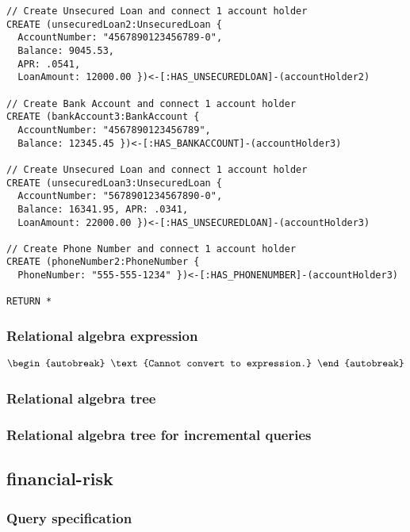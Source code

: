 \begin{lstlisting}
// Create Unsecured Loan and connect 1 account holder
CREATE (unsecuredLoan2:UnsecuredLoan {
  AccountNumber: "4567890123456789-0",
  Balance: 9045.53,
  APR: .0541,
  LoanAmount: 12000.00 })<-[:HAS_UNSECUREDLOAN]-(accountHolder2)

// Create Bank Account and connect 1 account holder
CREATE (bankAccount3:BankAccount {
  AccountNumber: "4567890123456789",
  Balance: 12345.45 })<-[:HAS_BANKACCOUNT]-(accountHolder3)

// Create Unsecured Loan and connect 1 account holder
CREATE (unsecuredLoan3:UnsecuredLoan {
  AccountNumber: "5678901234567890-0",
  Balance: 16341.95, APR: .0341,
  LoanAmount: 22000.00 })<-[:HAS_UNSECUREDLOAN]-(accountHolder3)

// Create Phone Number and connect 1 account holder
CREATE (phoneNumber2:PhoneNumber {
  PhoneNumber: "555-555-1234" })<-[:HAS_PHONENUMBER]-(accountHolder3)

RETURN *
\end{lstlisting}

\subsubsection*{Relational algebra expression}

\begin{align*}
\begin{autobreak}
\text{Cannot convert to expression.}
\end{autobreak}
\end{align*}

\subsubsection*{Relational algebra tree}


\subsubsection*{Relational algebra tree for incremental queries}

\subsection{financial-risk}

\subsubsection*{Query specification}

